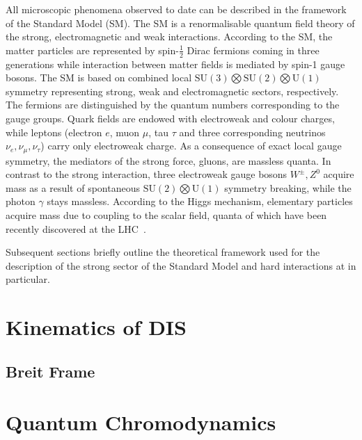 All microscopic phenomena observed to date can be described in the framework of the Standard Model (SM). The SM is a renormalisable quantum field theory of the strong, electromagnetic and weak interactions. According to the SM, the matter particles are represented by spin-$\frac{1}{2}$ Dirac fermions coming in three generations while interaction between matter fields is mediated by spin-1 gauge bosons. The SM is based on combined local $\mathrm{SU}\left(3\right) \bigotimes \mathrm{SU}\left(2\right) \bigotimes \mathrm{U}\left(1\right)$ symmetry representing strong, weak and electromagnetic sectors, respectively. The fermions are distinguished by the quantum numbers corresponding to the gauge groups. Quark fields are endowed with electroweak and colour charges, while leptons (electron $e$, muon $\mu$, tau $\tau$ and three corresponding neutrinos $\nu_e, \nu_\mu, \nu_\tau$) carry only electroweak charge. As a consequence of exact local gauge symmetry, the mediators of the strong force, gluons, are massless quanta. In contrast to the strong interaction, three electroweak gauge bosons $W^\pm, Z^0$ acquire mass as a result of spontaneous $\mathrm{SU}\left(2\right) \bigotimes \mathrm{U}\left(1\right)$ symmetry breaking, while the photon $\gamma$ stays massless. According to the Higgs mechanism, elementary particles acquire mass due to coupling to the scalar field, quanta of which have been recently discovered at the LHC~\cite{higgs atlas cms}.

Subsequent sections briefly outline the theoretical framework used for the description of the strong sector of the Standard Model and hard interactions at \hera in particular.

\section{Kinematics of DIS}
\label{sec:kindis}


\subsection{Breit Frame}
\label{subsec:breitframe}


\section{Quantum Chromodynamics}


